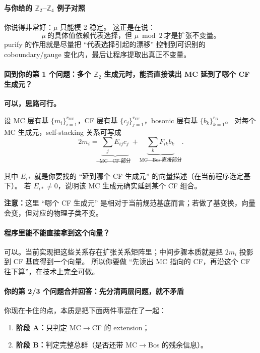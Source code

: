\documentclass[a4paper,fontset=ubuntu,12pt]{ctexart}
\begin{document}
\paragraph{与你给的 $\mathbb{Z}_2$--$\mathbb{Z}_4$ 例子对照}
你说得非常好：$\mu$ 只能模 2 稳定。
这正是在说：
\begin{equation}
\mu\ \text{的具体值依赖代表选择，但 }\mu \bmod 2\ \text{才是扩张不变量。}
\label{eq:mu-parity-only}
\end{equation}
purify 的作用就是尽量把 ``代表选择引起的漂移'' 控制到可识别的 coboundary/gauge 变化内，最后让程序提取出真正不变量。

\paragraph{回到你的第 1 个问题：多个 $\mathbb{Z}_2$ 生成元时，能否直接读出 MC 延到了哪个 CF 生成元？}
\textbf{可以，思路可行。}

设 MC 层有基 $\{m_i\}_{i=1}^{r_{\mathrm{MC}}}$，CF 层有基 $\{c_j\}_{j=1}^{r_{\mathrm{CF}}}$，bosonic 层有基 $\{b_k\}_{k=1}^{r_{\mathrm{B}}}$。
对每个 MC 生成元，self-stacking 关系可写成
\begin{equation}
2m_i=\underbrace{\sum_{j}E_{ij}c_j}_{\text{MC}\to\text{CF 部分}}+
\underbrace{\sum_{k}F_{ik}b_k}_{\text{MC}\to\text{Bos 直接部分}}.
\label{eq:mc-relation-ef}
\end{equation}

其中 $E_{i*}$ 就是你要找的 ``延到哪个 CF 生成元'' 的向量描述（在当前程序选定基下）。
若 $E_{i*}\neq 0$，说明该 MC 生成元确实延到某个 CF 组合。

\textbf{注意：}这里 ``哪个 CF 生成元'' 是相对于当前规范基底而言；若做了基变换，向量会变，但对应的物理子类不变。

\paragraph{程序里能不能直接拿到这个向量？}
可以。当前实现把这些关系存在扩张关系矩阵里；中间步骤本质就是把 $2m_i$ 投影到 CF 基底得到一个向量。
所以你要做 ``先读出 MC 指向的 CF，再沿这个 CF 往下算''，在技术上完全可做。

\paragraph{你的第 2/3 个问题合并回答：先分清两层问题，就不矛盾}
你现在卡住的点，本质是把下面两件事混在了一起：
\begin{enumerate}
\item \textbf{阶段 A：}只判定 MC$\to$CF 的 extension；
\item \textbf{阶段 B：}判定完整总群（是否还带 MC$\to$Bos 的残余信息）。
\end{enumerate}
\end{document}
